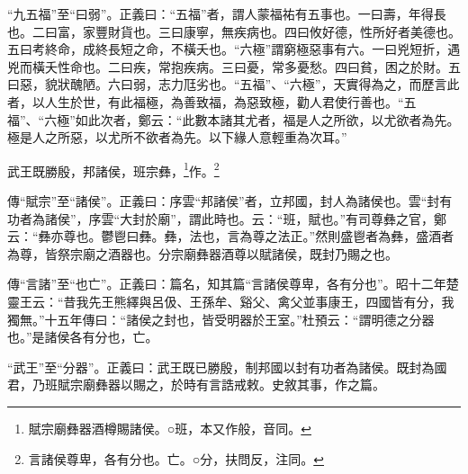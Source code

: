 {\noindent\shu{}\fzkt “九五福”至“曰弱”。正義曰：“五福”者，謂人蒙福祐有五事也。一曰壽，年得長也。二曰富，家豐財貨也。三曰康寧，無疾病也。四曰攸好德，性所好者美德也。五曰考終命，成終長短之命，不橫夭也。“六極”謂窮極惡事有六。一曰兇短折，遇兇而橫夭性命也。二曰疾，常抱疾病。三曰憂，常多憂愁。四曰貧，困之於財。五曰惡，貌狀醜陋。六曰弱，志力尫劣也。“五福”、“六極”，天實得為之，而歷言此者，以人生於世，有此福極，為善致福，為惡致極，勸人君使行善也。“五福”、“六極”如此次者，鄭云：“此數本諸其尤者，福是人之所欲，以尤欲者為先。極是人之所惡，以尤所不欲者為先。以下緣人意輕重為次耳。” \par}

武王既勝殷，邦諸侯，班宗彝，\footnote{賦宗廟彝器酒樽賜諸侯。○班，本又作般，音同。}作。\footnote{言諸侯尊卑，各有分也。亡。○分，扶問反，注同。}

{\noindent\zhuan{}\fzbyks 傳“賦宗”至“諸侯”。正義曰：序雲“邦諸侯”者，立邦國，封人為諸侯也。雲“封有功者為諸侯”，序雲“大封於廟”，謂此時也。云：“班，賦也。”有司尊彝之官，鄭云：“彝亦尊也。鬱鬯曰彝。彝，法也，言為尊之法正。”然則盛鬯者為彝，盛酒者為尊，皆祭宗廟之酒器也。分宗廟彝器酒尊以賦諸侯，既封乃賜之也。 \par}

{\noindent\zhuan{}\fzbyks 傳“言諸”至“也亡”。正義曰：篇名，知其篇“言諸侯尊卑，各有分也”。昭十二年楚靈王云：“昔我先王熊繹與呂伋、王孫牟、谿父、禽父並事康王，四國皆有分，我獨無。”十五年傳曰：“諸侯之封也，皆受明器於王室。”杜預云：“謂明德之分器也。”是諸侯各有分也，亡。 \par}

{\noindent\shu{}\fzkt “武王”至“分器”。正義曰：武王既已勝殷，制邦國以封有功者為諸侯。既封為國君，乃班賦宗廟彝器以賜之，於時有言誥戒敕。史敘其事，作之篇。 \par}

